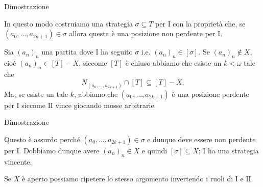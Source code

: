 \documentclass[aspectratio=43]{beamer}
\begin{document}
\begin{frame}{Dimostrazione}
  \begin{block}{}
    In questo modo costruiamo una strategia \(\sigma \subseteq T\) per \(\mathrm{I}\) con la proprietà che, se \((a_0, \ldots, a_{2n+1}) \in \sigma\) allora questa è una posizione non perdente per \(\mathrm{I}\).
  \end{block}
  \pause
  \begin{block}{}
    Sia \((a_n)_n\) una partita dove \(\mathrm{I}\) ha seguito \(\sigma\) i.e. \((a_n)_n \in [\sigma]\).
    Se \((a_n)_n \not\in X\), cioè \((a_n)_n \in [T] - X\), siccome \([T]\) è chiuso abbiamo che esiste un \(k < \omega\) tale che
    \begin{equation*}
      N_{(a_0, \ldots, a_{2k+1})}\cap[T] \subseteq [T] - X.
    \end{equation*}
    Ma, se esiste un tale \(k\), abbiamo che \((a_0, \ldots, a_{2k+1})\) è una posizione perdente per \(\mathrm{I}\) siccome \(\mathrm{II}\) vince giocando mosse arbitrarie.

  \end{block}
\end{frame}

\begin{frame}{Dimostrazione}
  \begin{block}{}
    Questo è assurdo perché \((a_0, \ldots, a_{2k+1}) \in \sigma\) e dunque deve essere non perdente per \(\mathrm{I}\).
    Dobbiamo dunque avere \((a_n)_n \in X\) e quindi \([\sigma] \subseteq X\); \(\mathrm{I}\) ha una strategia vincente.
  \end{block}
  \pause
  \begin{block}{}
    Se \(X\) è aperto possiamo ripetere lo stesso argomento invertendo i ruoli di \(\mathrm{I}\) e \(\mathrm{II}\).
    \begin{flushright}
      \qedsymbol
    \end{flushright}
  \end{block}
\end{frame}
\end{document}
